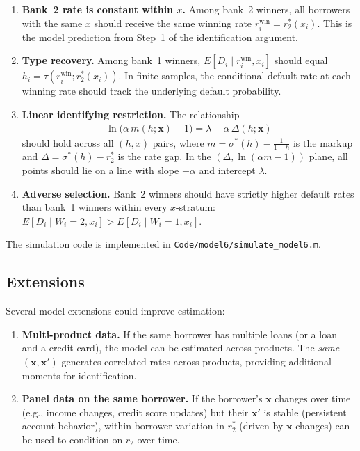 \documentclass[12pt]{article}
\theoremstyle{plain}
\theoremstyle{plain}
\theoremstyle{definition}  %
\theoremstyle{remark}  %
\begin{document}
\begin{enumerate}
    \item \textbf{Bank~2 rate is constant within $x$.} Among bank~2 winners, all borrowers with the same $x$ should receive the same winning rate $r_i^{\text{win}} = r_2^*(x_i)$. This is the model prediction from Step~1 of the identification argument.
    
    \item \textbf{Type recovery.} Among bank~1 winners, $E[D_i \mid r_i^{\text{win}}, x_i]$ should equal $h_i = \tau(r_i^{\text{win}}; r_2^*(x_i))$. In finite samples, the conditional default rate at each winning rate should track the underlying default probability.
    
    \item \textbf{Linear identifying restriction.} The relationship
    \begin{align}\label{eq:id_check}
        \ln\!\big(\alpha\, m(h;\mathbf{x}) - 1\big) = \lambda - \alpha\, \Delta(h;\mathbf{x})
    \end{align}
    should hold across all $(h, x)$ pairs, where $m = \sigma^*(h) - \frac{1}{1-h}$ is the markup and $\Delta = \sigma^*(h) - r_2^*$ is the rate gap. In the $(\Delta, \ln(\alpha m - 1))$ plane, all points should lie on a line with slope $-\alpha$ and intercept $\lambda$.
    
    \item \textbf{Adverse selection.} Bank~2 winners should have strictly higher default rates than bank~1 winners within every $x$-stratum: $E[D_i \mid W_i\!=\!2, x_i] > E[D_i \mid W_i\!=\!1, x_i]$.
\end{enumerate}

\noindent
The simulation code is implemented in \texttt{Code/model6/simulate\_model6.m}.



\newpage

\subsection{Extensions}\label{sec:extensions}

Several model extensions could improve estimation:

\begin{enumerate}
    \item \textbf{Multi-product data.} If the same borrower has multiple loans (or a loan and a credit card), the model can be estimated across products. The \emph{same} $(\mathbf{x}, \mathbf{x}')$ generates correlated rates across products, providing additional moments for identification.
    
    \item \textbf{Panel data on the same borrower.} If the borrower's $\mathbf{x}$ changes over time (e.g., income changes, credit score updates) but their $\mathbf{x}'$ is stable (persistent account behavior), within-borrower variation in $r_2^*$ (driven by $\mathbf{x}$ changes) can be used to condition on $r_2$ over time.
\end{enumerate}
\end{document}
